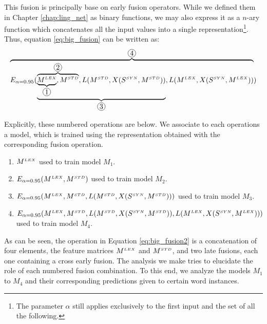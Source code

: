 This fusion is principally base on early fusion operators. While we defined them in Chapter \ref{chap:ling_net} as  binary functions, we may also express it as a $n$-ary function which concatenates all the input values into a single representation\footnote{The parameter $\alpha$ still applies exclusively to the first input and the set of all the following.}. Thus, equation \ref{eq:big_fusion} can be written as:
\begin{equation}\label{eq:big_fusion2}
\overbrace{E_{\alpha=0.95}(\underbrace{\overbrace{\underbrace{\mlex}_{\circled{1}},\mstd}^{\circled{2}},L(\mstd, X(\ssyn, \mstd))}_{\circled{3}}, L(\mlex, X(\ssyn, \mlex))}^{\circled{4}})
\end{equation}

Explicitly, these numbered operations are below. We associate to each operations a model, which is trained using the representation obtained with the corresponding fusion operation.
\begin{enumerate}
\item[\circled{1}] $M^{\scriptscriptstyle LEX}$ \label{eq:f1} used to train model $M_1$.
\item[\circled{2}] $E_{\alpha=0.95}(M^{\scriptscriptstyle LEX}, M^{\scriptscriptstyle STD})$ \label{eq:f2} used to train model $M_2$.
\item[\circled{3}] $E_{\alpha=0.95}(M^{\scriptscriptstyle LEX}, M^{\scriptscriptstyle STD}, L(M^{\scriptscriptstyle STD}, X(S^{\scriptscriptstyle SYN}, M^{\scriptscriptstyle STD})))$ used to train model $M_3$. \label{eq:f3}
\item[\circled{4}] $E_{\alpha=0.95}(M^{\scriptscriptstyle LEX}, M^{\scriptscriptstyle STD}, L(M^{\scriptscriptstyle STD}, X(S^{\scriptscriptstyle SYN}, M^{\scriptscriptstyle STD})), L(M^{\scriptscriptstyle LEX}, X(S^{\scriptscriptstyle SYN}, M^{\scriptscriptstyle LEX})))$ used to train model $M_4$. \label{eq:f4}
\end{enumerate}

As can be seen, the operation in Equation \ref{eq:big_fusion2} is a concatenation of four elements, the feature matrices $M^{\scriptscriptstyle LEX}$ and $M^{\scriptscriptstyle STD}$, and two late fusions, each one containing a cross early fusion. The analysis we make tries to elucidate the role of each numbered fusion combination. To this end, we analyze the models $M_1$ to $M_4$ and their corresponding predictions given to certain word instances. 

